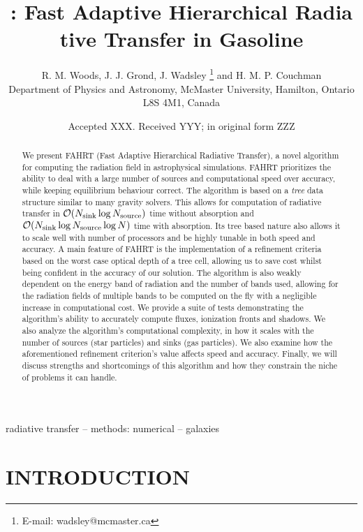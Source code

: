 \documentclass[fleqn,usenatbib]{mnras}
\title[Tree-Based Radiative Transfer]{\acro{}: Fast Adaptive Hierarchical Radia
tive Transfer in Gasoline}
\author[R. M. Woods et al.]{
R. M. Woods,
J. J. Grond,
J. Wadsley \thanks{E-mail:  wadsley@mcmaster.ca}
and H. M. P. Couchman
\\
Department of Physics and Astronomy, McMaster University, Hamilton, Ontario L8S
 4M1, Canada}
\date{Accepted XXX. Received YYY; in original form ZZZ}
\newcommand{\acro}{FAHRT}
\begin{document}
\label{firstpage}
\pagerange{\pageref{firstpage}--\pageref{lastpage}}
\maketitle

\begin{abstract}
We present \acro{} (Fast Adaptive Hierarchical Radiative Transfer), a novel 
algorithm for computing the radiation field in astrophysical simulations. 
\acro{} prioritizes the ability to deal with a large number of sources and 
computational speed over accuracy, while keeping equilibrium behaviour correct.
 The algorithm is based on a \emph{tree} data structure similar to many gravity
 solvers. This allows for computation of radiative transfer in 
$\mathcal{O}(N_{\rm sink} \log N_{\rm source})$ time without absorption and 
$\mathcal{O}(N_{\rm sink} \log N_{\rm source} \log{N})$ time with absorption. 
Its tree based nature also allows it to scale well with number of processors 
and be highly tunable in both speed and accuracy. A main feature of \acro{} is 
the implementation of a refinement criteria based on the worst case optical 
depth of a tree cell, allowing us to save cost whilst being confident in the 
accuracy of our solution. The algorithm is also weakly dependent on the energy 
band of radiation and the number of bands used, allowing for the radiation 
fields of multiple bands to be computed on the fly with a negligible increase 
in computational cost. We provide a suite of tests demonstrating the 
algorithm's ability to accurately compute fluxes, ionization fronts and 
shadows. We also analyze the algorithm's computational complexity, in how it 
scales with the number of sources (star particles) and sinks (gas particles). 
We also examine how the aforementioned refinement criterion's value affects 
speed and accuracy. Finally, we will discuss strengths and shortcomings of this
 algorithm and how they constrain the niche of problems it can handle.
\end{abstract}

\begin{keywords}
radiative transfer -- methods: numerical -- galaxies
\end{keywords}




\section{INTRODUCTION}\label{sec:intro}
\end{document}
